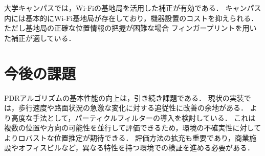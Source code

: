 \documentclass[a4paper, 10pt, twocolumn]{jarticle}
\begin{document}
大学キャンパスでは，Wi-Fiの基地局を活用した補正が有効である．
キャンパス内には基本的にWi-Fi基地局が存在しており，機器設置のコストを抑えられる．
ただし基地局の正確な位置情報の把握が困難な場合
フィンガープリントを用いた補正が適している．



\section{今後の課題}
PDRアルゴリズムの基本性能の向上は，引き続き課題である．
現状の実装では，歩行速度や路面状況の急激な変化に対する追従性に改善の余地がある．
より高度な手法として，パーティクルフィルターの導入を検討している．
これは複数の位置や方向の可能性を並行して評価できるため，環境の不確実性に対してよりロバストな位置推定が期待できる．
評価方法の拡充も重要であり，商業施設やオフィスビルなど，異なる特性を持つ環境での検証を進める必要がある．




\end{document}
